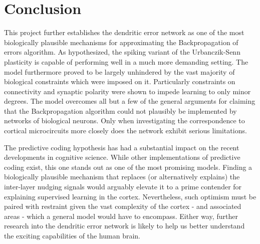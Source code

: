 \section{Conclusion}

This project further establishes the dendritic error network as one of the most biologically plausible mechanisms for
approximating the Backpropagation of errors algorithm. As hypothesized, the spiking variant of the Urbanczik-Senn
plasticity is capable of performing well in a much more demanding setting. The model furthermore proved to be largely
unhindered by the vast majority of biological constraints which were imposed on it. Particularly constraints on
connectivity and synaptic polarity were shown to impede learning to only minor degrees. The model overcomes all but a
few of the general arguments for claiming that the Backpropagation algorithm could not plausibly be implemented by
networks of biological neurons. Only when investigating the correspondence to cortical microcircuits more closely does
the network exhibit serious limitations. 

The predictive coding hypothesis has had a substantial impact on the recent developments in cognitive science. While
other implementations of predictive coding exist, this one stands out as one of the most promising models. Finding a
biologically plausible mechanism that replaces (or alternatively explains) the inter-layer nudging signals would
arguably elevate it to a prime contender for explaining supervised learning in the cortex. Nevertheless, such optimism
must be paired with restraint given the vast complexity of the cortex - and associated areas - which a general model
would have to encompass. Either way, further research into the dendritic error network is likely to help us better
understand the exciting capabilities of the human brain.